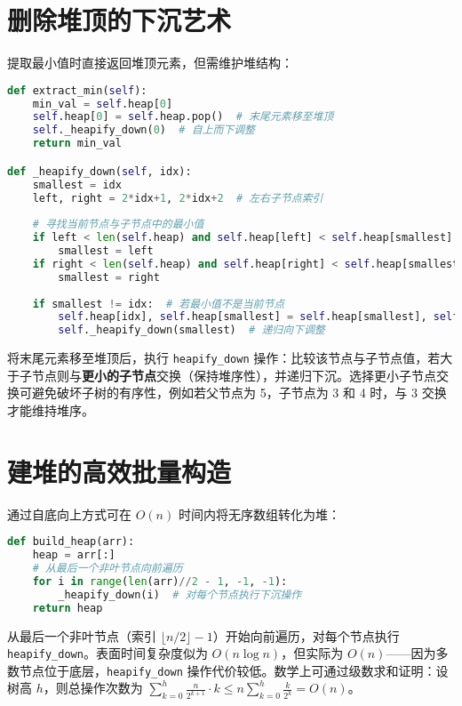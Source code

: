 \section{删除堆顶的下沉艺术}
提取最小值时直接返回堆顶元素，但需维护堆结构：\par
\begin{lstlisting}[language=python]
def extract_min(self):
    min_val = self.heap[0]
    self.heap[0] = self.heap.pop()  # 末尾元素移至堆顶
    self._heapify_down(0)  # 自上而下调整
    return min_val

def _heapify_down(self, idx):
    smallest = idx
    left, right = 2*idx+1, 2*idx+2  # 左右子节点索引
    
    # 寻找当前节点与子节点中的最小值
    if left < len(self.heap) and self.heap[left] < self.heap[smallest]:
        smallest = left
    if right < len(self.heap) and self.heap[right] < self.heap[smallest]:
        smallest = right
        
    if smallest != idx:  # 若最小值不是当前节点
        self.heap[idx], self.heap[smallest] = self.heap[smallest], self.heap[idx]
        self._heapify_down(smallest)  # 递归向下调整
\end{lstlisting}
将末尾元素移至堆顶后，执行 \texttt{heapify\_{}down} 操作：比较该节点与子节点值，若大于子节点则与\textbf{更小的子节点}交换（保持堆序性），并递归下沉。选择更小子节点交换可避免破坏子树的有序性，例如若父节点为 5，子节点为 3 和 4 时，与 3 交换才能维持堆序。\par
\section{建堆的高效批量构造}
通过自底向上方式可在 $O(n)$ 时间内将无序数组转化为堆：\par
\begin{lstlisting}[language=python]
def build_heap(arr):
    heap = arr[:]
    # 从最后一个非叶节点向前遍历
    for i in range(len(arr)//2 - 1, -1, -1):
        _heapify_down(i)  # 对每个节点执行下沉操作
    return heap
\end{lstlisting}
从最后一个非叶节点（索引 $\lfloor n/2 \rfloor -1$）开始向前遍历，对每个节点执行 \texttt{heapify\_{}down}。表面时间复杂度似为 $O(n \log n)$，但实际为 $O(n)$——因为多数节点位于底层，\texttt{heapify\_{}down} 操作代价较低。数学上可通过级数求和证明：设树高 $h$，则总操作次数为 $\sum_{k=0}^{h} \frac{n}{2^{k+1}} \cdot k \leq n \sum_{k=0}^{h} \frac{k}{2^{k}} = O(n)$。\par
